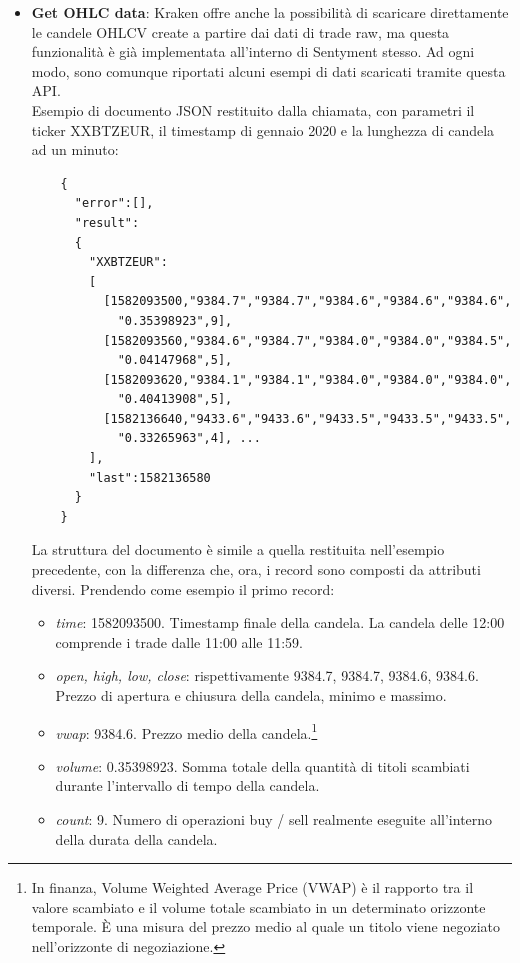 \documentclass[a4paper,12pt]{report}
\begin{document}
\begin{itemize}
	\item \textbf{Get OHLC data}: Kraken offre anche la possibilità di scaricare direttamente le candele OHLCV create a partire dai dati di trade raw, ma questa funzionalità è già implementata all'interno di Sentyment stesso. Ad ogni modo, sono comunque riportati alcuni esempi di dati scaricati tramite questa API.\\
	Esempio di documento JSON restituito dalla chiamata, con parametri il ticker XXBTZEUR, il timestamp di gennaio 2020 e la lunghezza di candela ad un minuto:
	\begin{verbatim}
	{
	  "error":[],
	  "result":
	  {
	    "XXBTZEUR":
	    [
	      [1582093500,"9384.7","9384.7","9384.6","9384.6","9384.6",
	        "0.35398923",9],
	      [1582093560,"9384.6","9384.7","9384.0","9384.0","9384.5",
	        "0.04147968",5],
	      [1582093620,"9384.1","9384.1","9384.0","9384.0","9384.0",
	        "0.40413908",5],
	      [1582136640,"9433.6","9433.6","9433.5","9433.5","9433.5",
	        "0.33265963",4], ...
	    ],
	    "last":1582136580
	  }
	} 
	\end{verbatim}
	
La struttura del documento è simile a quella restituita nell'esempio precedente, con la differenza che, ora, i record sono composti da attributi diversi. Prendendo come esempio il primo record:
	\begin{itemize}
		\item \textit{time}: 1582093500. Timestamp finale della candela. La candela delle 12:00 comprende i trade dalle 11:00 alle 11:59.
		\item \textit{open, high, low, close}: rispettivamente 9384.7, 9384.7, 9384.6, 9384.6. Prezzo di apertura e chiusura della candela, minimo e massimo.
		\item \textit{vwap}: 9384.6. Prezzo medio della candela.\footnote{In finanza, Volume Weighted Average Price (VWAP) è il rapporto tra il valore scambiato e il volume totale scambiato in un determinato orizzonte temporale. È una misura del prezzo medio al quale un titolo viene negoziato nell'orizzonte di negoziazione.}
		\item \textit{volume}: 0.35398923. Somma totale della quantità di titoli scambiati durante l'intervallo di tempo della candela.
		\item \textit{count}: 9. Numero di operazioni buy / sell realmente eseguite all'interno della durata della candela.
	\end{itemize}
\end{itemize}
\end{document}
